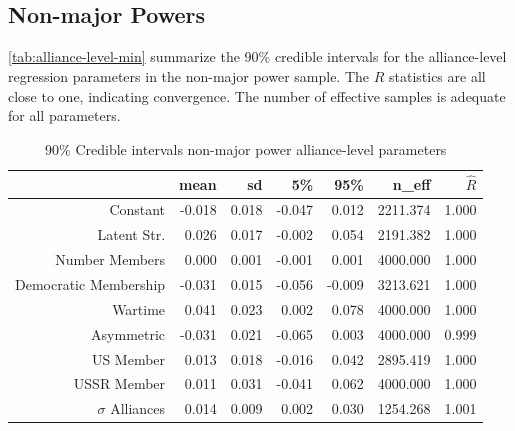 \documentclass[12pt]{article}
\begin{document}
\subsection{Non-major Powers} 

\autoref{tab:alliance-level-min} summarize the 90\% credible intervals for the alliance-level regression parameters in the non-major power sample. The $\hat{R}$ statistics are all close to one, indicating convergence. The number of effective samples is adequate for all parameters.

\begin{table}[ht]
\centering
\begin{tabular}{rrrrrrr}
  \hline
 & mean & sd & 5\% & 95\% & n\_eff & $\hat{R}$ \\ 
  \hline
Constant & -0.018 & 0.018 & -0.047 & 0.012 & 2211.374 & 1.000 \\ 
  Latent Str. & 0.026 & 0.017 & -0.002 & 0.054 & 2191.382 & 1.000 \\ 
  Number Members & 0.000 & 0.001 & -0.001 & 0.001 & 4000.000 & 1.000 \\ 
  Democratic Membership & -0.031 & 0.015 & -0.056 & -0.009 & 3213.621 & 1.000 \\ 
  Wartime & 0.041 & 0.023 & 0.002 & 0.078 & 4000.000 & 1.000 \\ 
  Asymmetric & -0.031 & 0.021 & -0.065 & 0.003 & 4000.000 & 0.999 \\ 
  US Member & 0.013 & 0.018 & -0.016 & 0.042 & 2895.419 & 1.000 \\ 
  USSR Member & 0.011 & 0.031 & -0.041 & 0.062 & 4000.000 & 1.000 \\ 
  $\sigma$ Alliances & 0.014 & 0.009 & 0.002 & 0.030 & 1254.268 & 1.001 \\ 
   \hline
\end{tabular}
\caption{90\% Credible intervals non-major power alliance-level parameters}
\label{tab:alliance-level-min}
\end{table}


  
%  
\end{document}
